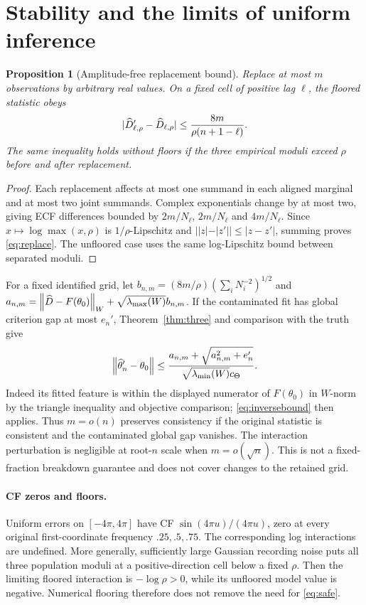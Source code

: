\documentclass[11pt,a4paper]{article}
\newtheorem{proposition}[theorem]{Proposition}
\theoremstyle{remark}\newtheorem{remark}[theorem]{Remark}
\begin{document}
\section{Stability and the limits of uniform inference}\label{sec:limits}
\begin{proposition}[Amplitude-free replacement bound]\label{prop:robust}
Replace at most $m$ observations by arbitrary real values. On a fixed cell of positive lag $\ell$, the floored statistic obeys
\begin{equation}\label{eq:replace}
|\widehat D'_{\ell,\rho}-\widehat D_{\ell,\rho}|\le\frac{8m}{\rho(n+1-\ell)}.
\end{equation}
The same inequality holds without floors if the three empirical moduli exceed $\rho$ before and after replacement.
\end{proposition}
\begin{proof}
Each replacement affects at most one summand in each aligned marginal and at most two joint summands. Complex exponentials change by at most two, giving ECF differences bounded by $2m/N_\ell$, $2m/N_\ell$ and $4m/N_\ell$. Since $x\mapsto\log\max(x,\rho)$ is $1/\rho$-Lipschitz and $||z|-|z'||\le|z-z'|$, summing proves \eqref{eq:replace}. The unfloored case uses the same log-Lipschitz bound between separated moduli.
\end{proof}

For a fixed identified grid, let $b_{n,m}=(8m/\rho)(\sum_iN_i^{-2})^{1/2}$ and
$a_{n,m}=\left\lVert\widehat D-F(\theta_0)\right\rVert_W+\sqrt{\lambda_{\max}(W)}b_{n,m}$.
If the contaminated fit has global criterion gap at most $e_n'$, Theorem~\ref{thm:three} and comparison with the truth give
\begin{equation}\label{eq:parameterrobust}
\left\lVert\widehat\theta_n'-\theta_0\right\rVert
\le\frac{a_{n,m}+\sqrt{a_{n,m}^2+e_n'}}{\sqrt{\lambda_{\min}(W)}c_\Theta}.
\end{equation}
Indeed its fitted feature is within the displayed numerator of $F(\theta_0)$ in $W$-norm by the triangle inequality and objective comparison; \eqref{eq:inversebound} then applies. Thus $m=o(n)$ preserves consistency if the original statistic is consistent and the contaminated global gap vanishes. The interaction perturbation is negligible at root-$n$ scale when $m=o(\sqrt n)$. This is not a fixed-fraction breakdown guarantee and does not cover changes to the retained grid.

\paragraph{CF zeros and floors.}
Uniform errors on $[-4\pi,4\pi]$ have CF $\sin(4\pi u)/(4\pi u)$, zero at every original first-coordinate frequency $.25,.5,.75$. The corresponding log interactions are undefined. More generally, sufficiently large Gaussian recording noise puts all three population moduli at a positive-direction cell below a fixed $\rho$. Then the limiting floored interaction is $-\log\rho>0$, while its unfloored model value is negative. Numerical flooring therefore does not remove the need for \eqref{eq:safe}.
\end{document}
